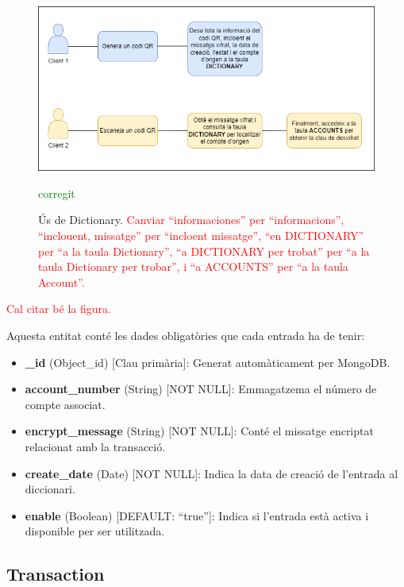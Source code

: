 \documentclass[a4paper,12pt,twoside]{ThesisStyle}
\newcommand{\pau}[1]{\textcolor{red}{#1}}
\newcommand{\sudan}[1]{\textcolor{green}{#1}}
\begin{document}
\begin{figure}[h]
    \centering
    \includegraphics[width=1\textwidth]{imatges/dictionary.png}
    \caption{Ús de Dictionary. \pau{Canviar ``informaciones'' per ``informacions'', ``inclouent, missatge'' per ``incloent missatge'', ``en DICTIONARY'' per ``a la taula Dictionary'', ``a DICTIONARY per trobat'' per ``a la taula Dictionary per trobar'', i ``a ACCOUNTS'' per ``a la taula Account''.}}\sudan{corregit}
    \label{fig: Ús de Dictionary}
\end{figure}



\pau{Cal citar bé la figura.}

Aquesta entitat conté les dades obligatòries que cada entrada ha de tenir:

\begin{itemize}
    \item \textbf{\_id} (Object\_id) [Clau primària]: Generat automàticament per MongoDB.
    \item \textbf{account\_number} (String) [NOT NULL]: Emmagatzema el número de compte associat.
    \item \textbf{encrypt\_message} (String) [NOT NULL]: Conté el missatge encriptat relacionat amb la transacció.
    \item \textbf{create\_date} (Date) [NOT NULL]: Indica la data de creació de l'entrada al diccionari.
    \item \textbf{enable} (Boolean) [DEFAULT: ``true'']: Indica si l'entrada està activa i disponible per ser utilitzada.
\end{itemize}



\subsection{Transaction}
\label{subsec: Transaction}
\end{document}
